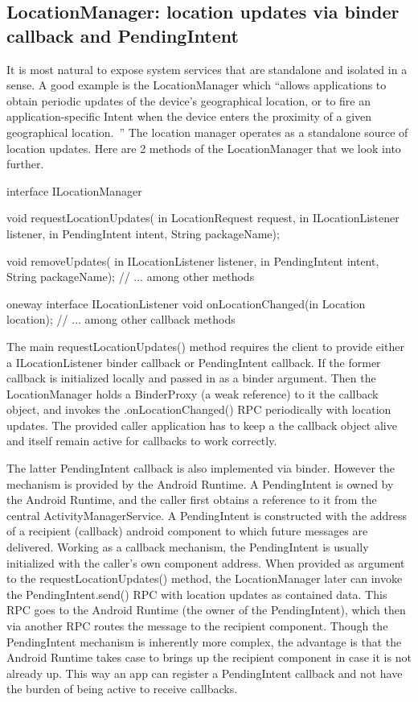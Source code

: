 \documentclass[prodmode]{acmlarge}
\begin{document}
\subsection{LocationManager: location updates via binder callback and PendingIntent}
It is most natural to expose system services that are standalone and isolated in a sense. A good example is the LocationManager which ``allows applications to obtain periodic updates of the device's geographical location, or to fire an application-specific Intent when the device enters the proximity of a given geographical location.~\cite{LocationManagerDocs}'' The location manager operates as a standalone source of location updates. Here are 2 methods of the LocationManager that we look into further.

\begin{snippet}
interface ILocationManager {
  void requestLocationUpdates(
      in LocationRequest request,
      in ILocationListener listener,
      in PendingIntent intent,
      String packageName);

  void removeUpdates(
      in ILocationListener listener,
      in PendingIntent intent,
      String packageName);
  // ... among other methods
}
\end{snippet}

\begin{snippet}
oneway interface ILocationListener {
    void onLocationChanged(in Location location);
    // ... among other callback methods
}
\end{snippet}

The main requestLocationUpdates() method requires the client to provide either a ILocationListener binder callback or PendingIntent callback. If the former callback is initialized locally and passed in as a binder argument. Then the LocationManager holds a BinderProxy (a weak reference) to it the callback object, and invokes the .onLocationChanged() RPC periodically with location updates. The provided caller application has to keep a the callback object alive and itself remain active for callbacks to work correctly.

The latter PendingIntent callback is also implemented via binder. However the mechanism is provided by the Android Runtime. A PendingIntent is owned by the Android Runtime, and the caller first obtains a reference to it from the central ActivityManagerService. A PendingIntent is constructed with the address of a recipient (callback) android component to which future messages are delivered. Working as a callback mechanism, the PendingIntent is usually initialized with the caller's own component address. When provided as argument to the requestLocationUpdates() method, the LocationManager later can invoke the PendingIntent.send() RPC with location updates as contained data. This RPC goes to the Android Runtime (the owner of the PendingIntent), which then via another RPC routes the message to the recipient component. Though the PendingIntent mechanism is inherently more complex, the advantage is that the Android Runtime takes case to brings up the recipient component in case it is not already up. This way an app can register a PendingIntent callback and not have the burden of being active to receive callbacks.
\end{document}
